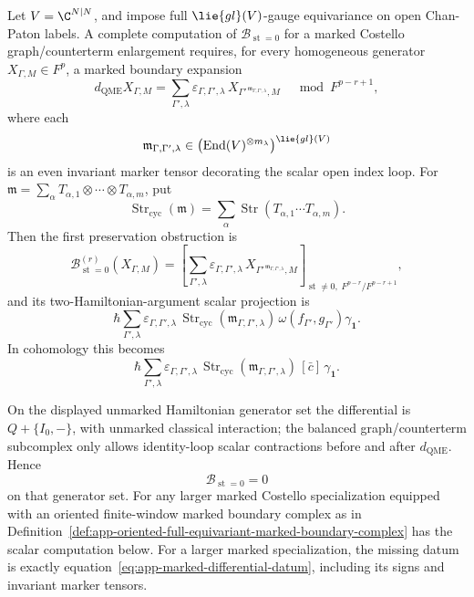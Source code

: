 \begin{prop}[Marked \(\mathcal B_{\operatorname{st}=0}\) and gauge-equivariant markers]
\label{prop:app-marked-bst0-equivariant-differential}
  Let \(V=\C^{N|N}\), and impose full \(\lie{gl}(V)\)-gauge
  equivariance on open Chan-Paton labels.  A complete computation
  of \(\mathcal B_{\operatorname{st}=0}\) for a marked
  Costello graph/counterterm enlargement requires, for every homogeneous
  generator \(X_{\Gamma,M}\in F^p\), a marked boundary expansion
  \[
    d_{\mathrm{QME}}X_{\Gamma,M}
      =
    \sum_{\Gamma',\lambda}
      \varepsilon_{\Gamma,\Gamma',\lambda}\,
      X_{\Gamma'^{\,\mathfrak m_{\Gamma,\Gamma',\lambda}},M}
      \quad \bmod F^{p-r+1},
    \label{eq:app-marked-differential-datum}
  \]
  where each
  \[
    \mathfrak m_{\Gamma,\Gamma',\lambda}
      \in
    \bigl(\operatorname{End}(V)^{\otimes m_{\lambda}}\bigr)^{\lie{gl}(V)}
  \]
  is an even invariant marker tensor decorating the scalar open index
  loop.  For
  \(\mathfrak m=\sum_\alpha
  T_{\alpha,1}\otimes\cdots\otimes T_{\alpha,m}\), put
  \[
    \operatorname{Str}_{\mathrm{cyc}}(\mathfrak m)
      =
    \sum_\alpha
      \operatorname{Str}(T_{\alpha,1}\cdots T_{\alpha,m}) .
  \]
  Then the first preservation obstruction is
  \[
    \mathcal B^{(r)}_{\operatorname{st}=0}(X_{\Gamma,M})
      =
    \left[
      \sum_{\Gamma',\lambda}
      \varepsilon_{\Gamma,\Gamma',\lambda}\,
      X_{\Gamma'^{\,\mathfrak m_{\Gamma,\Gamma',\lambda}},M}
    \right]_{\operatorname{st}\neq0,\;F^{p-r}/F^{p-r+1}},
  \]
  and its two-Hamiltonian-argument scalar projection is
  \[
    \hbar
    \sum_{\Gamma',\lambda}
      \varepsilon_{\Gamma,\Gamma',\lambda}\,
      \operatorname{Str}_{\mathrm{cyc}}
        (\mathfrak m_{\Gamma,\Gamma',\lambda})\,
      \omega(f_{\Gamma'},g_{\Gamma'})\gamma_{\mathbf 1}.
  \]
  In cohomology this becomes
  \[
    \hbar
    \sum_{\Gamma',\lambda}
      \varepsilon_{\Gamma,\Gamma',\lambda}\,
      \operatorname{Str}_{\mathrm{cyc}}
        (\mathfrak m_{\Gamma,\Gamma',\lambda})\,
      [\bar c]\,\gamma_{\mathbf 1}.
  \]

  On the displayed unmarked Hamiltonian generator set the
  differential is \(Q+\{I_0,-\}\), with unmarked classical interaction;
  the balanced graph/counterterm subcomplex only allows identity-loop
  scalar contractions before and after \(d_{\mathrm{QME}}\).  Hence
  \[
    \mathcal B_{\operatorname{st}=0}=0
  \]
  on that generator set.  For any larger marked Costello
  specialization equipped with an oriented finite-window marked
  boundary complex as in
  Definition~\ref{def:app-oriented-full-equivariant-marked-boundary-complex}
  has the scalar computation below.  For a larger marked specialization,
  the missing datum is exactly equation~\eqref{eq:app-marked-differential-datum},
  including its signs and invariant marker tensors.


\end{prop}
